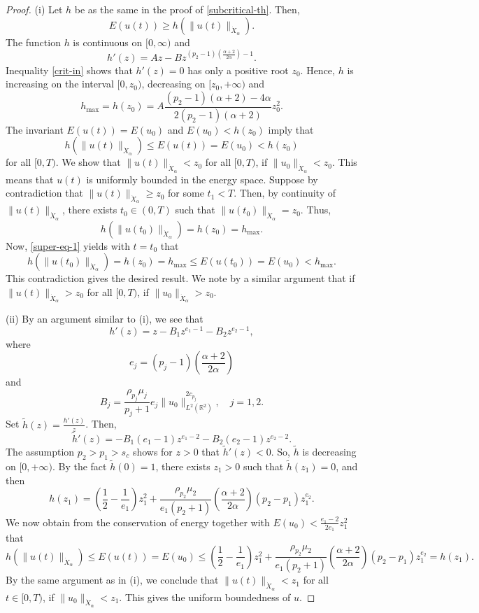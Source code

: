 \documentclass[10pt]{article}
\numberwithin{equation}{section}
\newcommand{\lt}{{L^2(\mathbb{R}^2)}}
\newcommand{\xx}{{\dot{X}_\alpha}}
\newcommand{\al}{\alpha}
\begin{document}
	\begin{proof}
		(i) 	Let $h$ be as the same in the proof of  \ref{subcritical-th}. Then,
		\[
		E(u(t))\geq  h(\|u(t)\|_\xx).
		\]
		The function $h$ is continuous on $[0,\infty)$ and
		\[
		h'(z)=Az-Bz^{(p_2-1)(\frac{\al+2}{2\al})-1}.
		\]
		Inequality \eqref{crit-in} shows that $h'(z)=0$ has only a positive root $z_0$. 	
		Hence, $h$ is increasing on the interval $[0,z_0)$, decreasing on $[z_0,+\infty)$ and
		\[
		h_{\max}=h(z_0)=A\frac{(p_2-1)(\al+2)-4\al}{2(p_2-1)(\al+2)}z_0^2.
		\]
		The invariant $E(u(t))=E(u_0)$ and $E(u_0)<h(z_0)$ imply that
		\begin{equation}\label{super-eq-1}
			h(\|u(t)\|_\xx)\leq E(u(t))=E(u_0)<h(z_0)
		\end{equation}
		for all $[0,T)$. We show that $\|u(t)\|_\xx<z_0$ for all $[0,T)$, if  $\|u_0\|_\xx<z_0$. This means that $u(t)$ is uniformly bounded in the energy space. Suppose by contradiction that $\|u(t)\|_\xx\geq z_0$ for some $t_1<T$. Then, by continuity of $\|u(t)\|_\xx$, there exists $t_0\in(0,T)$ such that $\|u(t_0)\|_\xx= z_0$. Thus,
		\[
		h(\|u(t_0)\|_\xx)=h(z_0)=h_{\max}.
		\]
		Now, \eqref{super-eq-1} yields with $t=t_0$ that
		\[
		h(\|u(t_0)\|_\xx)=h(z_0)=h_{\max}\leq E(u(t_0))=E(u_0)<h_{\max}.
		\]
		This contradiction gives the desired result. We note by a similar argument that if $\|u(t)\|_\xx>z_0$ for all $[0,T)$, if $\|u_0\|_\xx>z_0$. 
		
		(ii) By an argument similar to (i), we see that 
		\[
		h'(z)=z-B_1z^{e_1-1}-B_2z^{e_2-1},
		\]
		where
		\[
		e_j=(p_j-1)\left( \frac{\al+2}{2\al} \right)
		\]
		and
		\[
		B_j=\frac{\rho_{p_j}\mu_j}{p_j+1}e_j\|u_0\|_\lt^{2c_{p_j}},\quad j=1,2.
		\]
		Set $\tilde{h}(z)=\frac{h'(z)}{z}$. Then,
		\[
		\tilde{h}'(z)=-B_1\left(e_1-1\right)z^{e_1-2}
		-B_2\left(e_2-1\right)z^{e_2-2}.
		\]
		The assumption $p_2>p_1>s_c$ shows for $z>0$ that $\tilde{h}'(z)<0$. So, $\tilde{h}$ is decreasing on $[0,+\infty)$. By the fact $\tilde{h}(0)=1$, there exists $z_1>0$ such that $\tilde{h}(z_1)=0$, and then
		\[
		h(z_1)=\left(\frac{1}{2}-\frac{1}{e_1}\right)z_1^2+\frac{\rho_{p_2}\mu_2}{e_1(p_2+1)}\left( \frac{\al+2}{2\al} \right)(p_2-p_1)z_1^{e_2}.
		\]
		We now obtain from the conservation of energy  together with $E(u_0)<\frac{e_1-2}{2e_1}z_1^2$ that
		\[
		h 	(\|u(t)\|_\xx)\leq E(u(t))=E(u_0)
		\leq
		\left(\frac{1}{2}-\frac{1}{e_1}\right)z_1^2+\frac{\rho_{p_2}\mu_2}{e_1(p_2+1)}\left( \frac{\al+2}{2\al} \right)(p_2-p_1)z_1^{e_2}
		=h(z_1).
		\]
		By the same argument as in (i), we conclude that $\|u(t)\|_\xx<z_1$ for all $t\in[0,T)$, if $\|u_0\|_\xx<z_1$. This gives the uniform boundedness of $u$.
	\end{proof}
	
\end{document}
